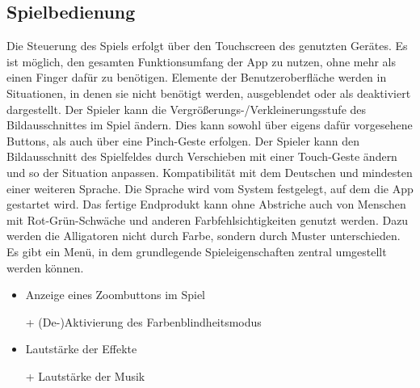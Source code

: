 \subsection {Spielbedienung}
\begin {requirements}
	 Die Steuerung des Spiels erfolgt über den Touchscreen des genutzten Gerätes.
	 Es ist möglich, den gesamten Funktionsumfang der App zu nutzen, ohne mehr als einen Finger dafür zu benötigen.
	 Elemente der Benutzeroberfläche werden in Situationen, in denen sie nicht benötigt werden, ausgeblendet oder als deaktiviert dargestellt.
	 Der Spieler kann die Vergrößerungs-/Verkleinerungsstufe des Bildausschnittes im Spiel ändern.
	Dies kann sowohl über eigens dafür vorgesehene Buttons, als auch über eine Pinch-Geste erfolgen.
	Der Spieler kann den Bildausschnitt des Spielfeldes durch Verschieben mit einer Touch-Geste ändern und so der Situation anpassen.
	Kompatibilität mit dem Deutschen und mindesten einer weiteren Sprache.
	Die Sprache wird vom System festgelegt, auf dem die App gestartet wird.
	Das fertige Endprodukt kann ohne Abstriche auch von Menschen mit Rot-Grün-Schwäche und anderen Farbfehlsichtigkeiten genutzt werden.
	Dazu werden die Alligatoren nicht durch Farbe, sondern durch Muster unterschieden.
	 Es gibt ein Menü, in dem grundlegende Spieleigenschaften zentral umgestellt werden können.
		\begin{itemize}
			\item Anzeige eines Zoombuttons im Spiel
			\item[+] (De-)Aktivierung des Farbenblindheitsmodus
			\item Lautstärke der Effekte
			\item[+] Lautstärke der Musik
		\end{itemize}
\end {requirements}

